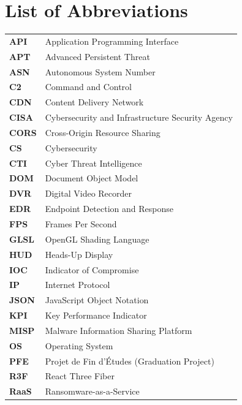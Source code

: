 \documentclass[12pt,a4paper,oneside]{book}
\begin{document}


\frontmatter
\fancyfoot[C]{}




\tableofcontents
\newpage
\listoffigures
\newpage
\listoftables
\newpage

\chapter*{List of Abbreviations}
\begin{longtable}{ll}
\textbf{API} & Application Programming Interface \\
\textbf{APT} & Advanced Persistent Threat \\
\textbf{ASN} & Autonomous System Number \\
\textbf{C2} & Command and Control \\
\textbf{CDN} & Content Delivery Network \\
\textbf{CISA} & Cybersecurity and Infrastructure Security Agency \\
\textbf{CORS} & Cross-Origin Resource Sharing \\
\textbf{CS} & Cybersecurity \\
\textbf{CTI} & Cyber Threat Intelligence \\
\textbf{DOM} & Document Object Model \\
\textbf{DVR} & Digital Video Recorder \\
\textbf{EDR} & Endpoint Detection and Response \\
\textbf{FPS} & Frames Per Second \\
\textbf{GLSL} & OpenGL Shading Language \\
\textbf{HUD} & Heads-Up Display \\
\textbf{IOC} & Indicator of Compromise \\
\textbf{IP} & Internet Protocol \\
\textbf{JSON} & JavaScript Object Notation \\
\textbf{KPI} & Key Performance Indicator \\
\textbf{MISP} & Malware Information Sharing Platform \\
\textbf{OS} & Operating System \\
\textbf{PFE} & Projet de Fin d'Études (Graduation Project) \\
\textbf{R3F} & React Three Fiber \\
\textbf{RaaS} & Ransomware-as-a-Service \\

\end{longtable}
\end{document}
